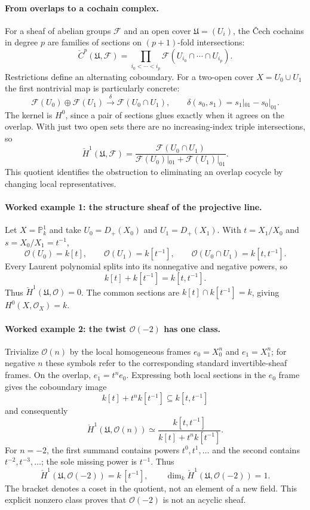 \paragraph{From overlaps to a cochain complex.}
For a sheaf of abelian groups $\mathcal F$ and an open cover
$\mathfrak U=(U_i)$, the \v{C}ech cochains in degree $p$ are
families of sections on $(p+1)$-fold intersections:
\[
 \check C^p(\mathfrak U,\mathcal F)=
 \prod_{i_0<\cdots<i_p}
 \mathcal F(U_{i_0}\cap\cdots\cap U_{i_p}).
\]
Restrictions define an alternating coboundary.  For a two-open
cover $X=U_0\cup U_1$ the first nontrivial map is particularly
concrete:
\[
 \mathcal F(U_0)\oplus\mathcal F(U_1)
 \xrightarrow{\ \delta\ }\mathcal F(U_0\cap U_1),
 \qquad\delta(s_0,s_1)=s_1|_{01}-s_0|_{01}.
\]
The kernel is $H^0$, since a pair of sections glues exactly
when it agrees on the overlap.  With just two open sets there
are no increasing-index triple intersections, so
\[
 \check H^1(\mathfrak U,\mathcal F)
 =\frac{\mathcal F(U_0\cap U_1)}
 {\mathcal F(U_0)|_{01}+\mathcal F(U_1)|_{01}}.
\]
This quotient identifies the obstruction to eliminating an
overlap cocycle by changing local representatives.

\paragraph{Worked example 1: the structure sheaf of the projective line.}
Let $X=\mathbb P^1_k$ and take $U_0=D_+(X_0)$ and
$U_1=D_+(X_1)$.  With $t=X_1/X_0$ and $s=X_0/X_1=t^{-1}$,
\[
 \mathcal O(U_0)=k[t],\qquad
 \mathcal O(U_1)=k[t^{-1}],\qquad
 \mathcal O(U_0\cap U_1)=k[t,t^{-1}].
\]
Every Laurent polynomial splits into its nonnegative and
negative powers, so
\[
 k[t]+k[t^{-1}]=k[t,t^{-1}].
\]
Thus $\check H^1(\mathfrak U,\mathcal O)=0$.  The common
sections are $k[t]\cap k[t^{-1}]=k$, giving
$H^0(X,\mathcal O_X)=k$.

\paragraph{Worked example 2: the twist $\mathcal O(-2)$ has one class.}
Trivialize $\mathcal O(n)$ by the local homogeneous frames
$e_0=X_0^n$ and $e_1=X_1^n$; for negative $n$ these symbols
refer to the corresponding standard invertible-sheaf frames.
On the overlap, $e_1=t^n e_0$.  Expressing both local sections
in the $e_0$ frame gives the coboundary image
\[
 k[t]+t^n k[t^{-1}]\subseteq k[t,t^{-1}]
\]
and consequently
\[
 \check H^1(\mathfrak U,\mathcal O(n))
 \simeq\frac{k[t,t^{-1}]}{k[t]+t^n k[t^{-1}]}.
\]
For $n=-2$, the first summand contains powers $t^0,t^1,\dots$
and the second contains $t^{-2},t^{-3},\dots$; the sole missing
power is $t^{-1}$.  Thus
\[
 \check H^1(\mathfrak U,\mathcal O(-2))
 =k\,[t^{-1}],\qquad
 \dim_k\check H^1(\mathfrak U,\mathcal O(-2))=1.
\]
The bracket denotes a coset in the quotient, not an element
of a new field.  This explicit nonzero class proves that
$\mathcal O(-2)$ is not an acyclic sheaf.

